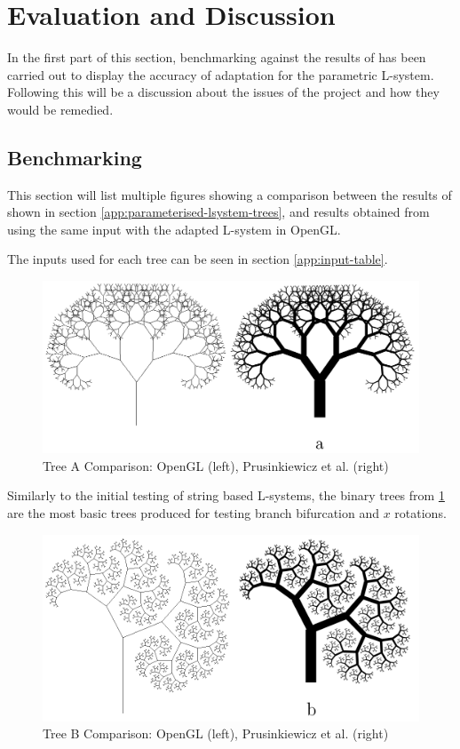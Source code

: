 \documentclass[final]{cmpreport}
\begin{document}
\section{Evaluation and Discussion}
In the first part of this section, benchmarking against the results of \cite{prusinkiewicz1996systems} 
has been carried out to display the accuracy of adaptation for the parametric L-system. Following 
this will be a discussion about the issues of the project and how they would be remedied. 

\subsection{Benchmarking}
This section will list multiple figures showing a comparison between the results of \cite{prusinkiewicz1996systems} 
shown in section \ref{app:parameterised-lsystem-trees}, and results obtained from using the 
same input with the adapted L-system in OpenGL.

The inputs used for each tree can be seen in section \ref{app:input-table}.

\begin{figure}[ht]
    \includegraphics[scale=0.4]{tree-comp-a.png} 
    \centering
    \captionsetup{justification=centering}
    \caption{Tree A Comparison: OpenGL (left), Prusinkiewicz et al. (right)}
    \label{fig:tree-comp-a}
\end{figure}

Similarly to the initial testing of string based L-systems, the binary trees from \ref{fig:tree-comp-a}  
are the most basic trees produced for testing branch bifurcation and $x$ rotations.

\begin{figure}[ht]
    \includegraphics[scale=0.35]{tree-comp-b.png} 
    \centering
    \captionsetup{justification=centering}
    \caption{Tree B Comparison: OpenGL (left), Prusinkiewicz et al. (right)}
    \label{fig:tree-comp-b}
\end{figure}
\end{document}

